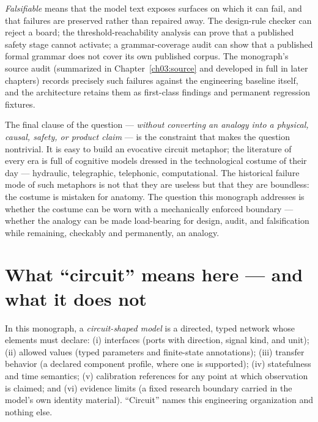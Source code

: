 \emph{Falsifiable} means that the model text exposes surfaces on which it can
fail, and that failures are preserved rather than repaired away. The
design-rule checker can reject a board; the threshold-reachability analysis
can prove that a published safety stage cannot activate; a grammar-coverage
audit can show that a published formal grammar does not cover its own
published corpus. The monograph's source audit (summarized in
Chapter~\ref{ch03:source} and developed in full in later chapters) records
precisely such failures against the engineering baseline itself, and the
architecture retains them as first-class findings and permanent regression
fixtures.

The final clause of the question --- \emph{without converting an analogy into
a physical, causal, safety, or product claim} --- is the constraint that
makes the question nontrivial. It is easy to build an evocative circuit
metaphor; the literature of every era is full of cognitive models dressed in
the technological costume of their day --- hydraulic, telegraphic,
telephonic, computational. The historical failure mode of such metaphors is
not that they are useless but that they are boundless: the costume is
mistaken for anatomy. The question this monograph addresses is whether the
costume can be worn with a mechanically enforced boundary --- whether the
analogy can be made load-bearing for design, audit, and falsification while
remaining, checkably and permanently, an analogy.

\section{What ``circuit'' means here --- and what it does not}\label{ch01:circuit}

\begin{definition}\label{ch01:def:circuit}
In this monograph, a \emph{circuit-shaped model} is a directed, typed network
whose elements must declare: (i) interfaces (ports with direction, signal
kind, and unit); (ii) allowed values (typed parameters and finite-state
annotations); (iii) transfer behavior (a declared component profile, where
one is supported); (iv) statefulness and time semantics; (v) calibration
references for any point at which observation is claimed; and (vi) evidence
limits (a fixed research boundary carried in the model's own identity
material). ``Circuit'' names this engineering organization and nothing else.
\end{definition}

